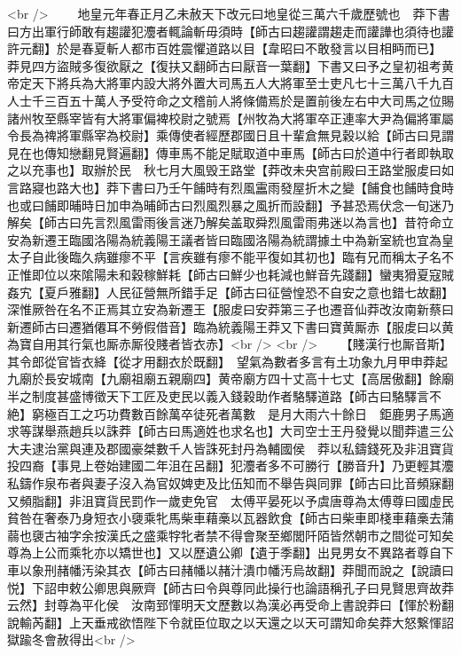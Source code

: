 <br />
　　地皇元年春正月乙未赦天下改元曰地皇從三萬六千歲歷號也　莽下書曰方出軍行師敢有趨讙犯灋者輒論斬毋須時【師古曰趨讙謂趨走而讙譁也須待也讙許元翻】於是春夏斬人都市百姓震懼道路以目【韋昭曰不敢發言以目相眄而已】　莽見四方盜賊多復欲厭之【復扶又翻師古曰厭音一葉翻】下書又曰予之皇初祖考黄帝定天下將兵為大將軍内設大將外置大司馬五人大將軍至士吏凡七十三萬八千九百人士千三百五十萬人予受符命之文稽前人將條備焉於是置前後左右中大司馬之位賜諸州牧至縣宰皆有大將軍偏裨校尉之號焉【州牧為大將軍卒正連率大尹為偏將軍屬令長為禆將軍縣宰為校尉】乘傳使者經歷郡國日且十輩倉無見穀以給【師古曰見謂見在也傳知戀翻見賢遍翻】傳車馬不能足賦取道中車馬【師古曰於道中行者即執取之以充事也】取辦於民　秋七月大風毁王路堂【莽改未央宫前殿曰王路堂服䖍曰如言路寢也路大也】莽下書曰乃壬午餔時有烈風靁雨發屋折木之變【餔食也餔時食時也或曰餔即晡時日加申為晡師古曰烈風烈暴之風折而設翻】予甚恐焉伏念一旬迷乃解矣【師古曰先言烈風雷雨後言迷乃解矣盖取舜烈風雷雨弗迷以為言也】昔符命立安為新遷王臨國洛陽為統義陽王議者皆曰臨國洛陽為統謂據土中為新室統也宜為皇太子自此後臨久病雖瘳不平【言疾雖有瘳不能平復如其初也】臨有兄而稱太子名不正惟即位以來隂陽未和穀稼鮮耗【師古曰鮮少也耗減也鮮音先踐翻】蠻夷猾夏寇賊姦宄【夏戶雅翻】人民征營無所錯手足【師古曰征營惶恐不自安之意也錯七故翻】深惟厥咎在名不正焉其立安為新遷王【服䖍曰安莽第三子也遷音仙莽改汝南新蔡曰新遷師古曰遷猶僊耳不勞假借音】臨為統義陽王莽又下書曰寶黄厮赤【服䖍曰以黄為寶自用其行氣也厮赤厮役賤者皆衣赤】<br />
<br />
　　【賤漢行也厮音斯】其令郎從官皆衣絳【從才用翻衣於既翻】　望氣為數者多言有土功象九月甲申莽起九廟於長安城南【九廟祖廟五親廟四】黄帝廟方四十丈高十七丈【高居傲翻】餘廟半之制度甚盛博徵天下工匠及吏民以義入錢穀助作者駱驛道路【師古曰駱驛言不絶】窮極百工之巧功費數百餘萬卒徒死者萬數　是月大雨六十餘日　鉅鹿男子馬適求等謀舉燕趙兵以誅莽【師古曰馬適姓也求名也】大司空士王丹發覺以聞莽遣三公大夫逮治黨與連及郡國豪桀數千人皆誅死封丹為輔國侯　莽以私鑄錢死及非沮寶貨投四裔【事見上卷始建國二年沮在呂翻】犯灋者多不可勝行【勝音升】乃更輕其灋私鑄作泉布者與妻子沒入為官奴婢吏及比伍知而不舉告與同罪【師古曰比音頻寐翻又頻脂翻】非沮寶貨民罰作一歲吏免官　太傅平晏死以予虞唐尊為太傅尊曰國虛民貧咎在奢泰乃身短衣小褏乘牝馬柴車藉槀以瓦器飲食【師古曰柴車即棧車藉槀去蒲蒻也褏古袖字余按漢氏之盛乘牸牝者禁不得會聚至鄉閭阡陌皆然朝市之間從可知矣尊為上公而乘牝亦以矯世也】又以歷遺公卿【遺于季翻】出見男女不異路者尊自下車以象刑赭幡汚染其衣【師古曰赭幡以赭汁潰巾幡汚烏故翻】莽聞而說之【說讀曰悦】下詔申敕公卿思與厥齊【師古曰令與尊同此操行也論語稱孔子曰見賢思齊故莽云然】封尊為平化侯　汝南郅惲明天文歷數以為漢必再受命上書說莽曰【惲於粉翻說輸芮翻】上天垂戒欲悟陛下令就臣位取之以天還之以天可謂知命矣莽大怒繋惲詔獄踰冬會赦得出<br />
